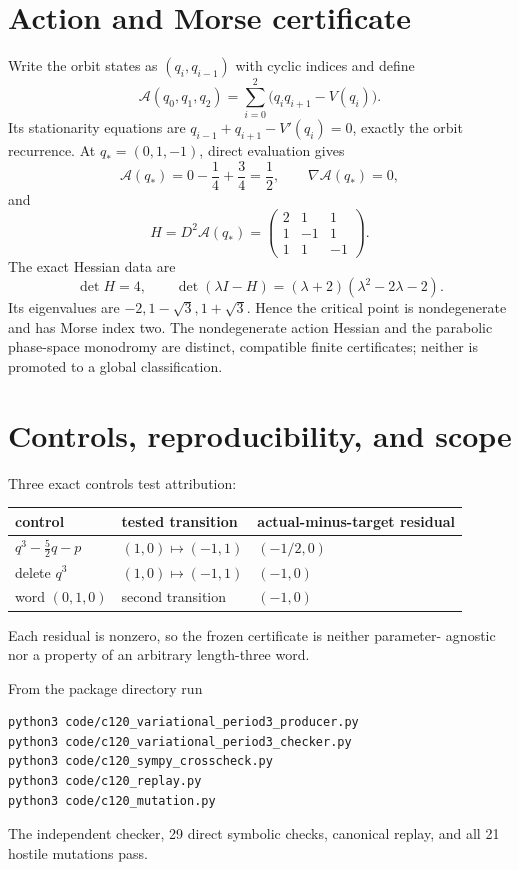 \documentclass[10pt]{article}
\begin{document}
\section{Action and Morse certificate}
Write the orbit states as $(q_i,q_{i-1})$ with cyclic indices and define
\[
 \mathcal A(q_0,q_1,q_2)=\sum_{i=0}^{2}
 \bigl(q_iq_{i+1}-V(q_i)\bigr).
\]
Its stationarity equations are
$q_{i-1}+q_{i+1}-V'(q_i)=0$, exactly the orbit recurrence.  At
$q_*=(0,1,-1)$, direct evaluation gives
\[
 \mathcal A(q_*)=0-\frac14+\frac34=\frac12,\qquad
 \nabla\mathcal A(q_*)=0,
\]
and
\[
 H=D^2\mathcal A(q_*)=
 \begin{pmatrix}2&1&1\\1&-1&1\\1&1&-1\end{pmatrix}.
\]
The exact Hessian data are
\[
 \det H=4,\qquad
 \det(\lambda I-H)=(\lambda+2)(\lambda^2-2\lambda-2).
\]
Its eigenvalues are $-2,1-\sqrt3,1+\sqrt3$.  Hence the critical point is
nondegenerate and has Morse index two.  The nondegenerate action Hessian and
the parabolic phase-space monodromy are distinct, compatible finite
certificates; neither is promoted to a global classification.

\section{Controls, reproducibility, and scope}
Three exact controls test attribution:
\begin{center}
\begin{tabular}{@{}lll@{}}
\toprule
control & tested transition & actual-minus-target residual\\
\midrule
$q^3-\tfrac52q-p$ & $(1,0)\mapsto(-1,1)$ & $(-1/2,0)$\\
delete $q^3$ & $(1,0)\mapsto(-1,1)$ & $(-1,0)$\\
word $(0,1,0)$ & second transition & $(-1,0)$\\
\bottomrule
\end{tabular}
\end{center}
Each residual is nonzero, so the frozen certificate is neither parameter-
agnostic nor a property of an arbitrary length-three word.

From the package directory run
\begin{verbatim}
python3 code/c120_variational_period3_producer.py
python3 code/c120_variational_period3_checker.py
python3 code/c120_sympy_crosscheck.py
python3 code/c120_replay.py
python3 code/c120_mutation.py
\end{verbatim}
The independent checker, 29 direct symbolic checks, canonical replay, and all
21 hostile mutations pass.
\end{document}
